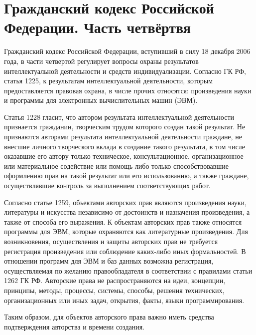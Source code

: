 \section{Гражданский кодекс Российской Федерации. Часть четвёртвя} \label{rights_gk}

Гражданский кодекс Российской Федерации, вступивший в силу 18 декабря 2006 года, в части четвертой регулирует вопросы охраны результатов интеллектуальной деятельности и  средств индивидуализации. Согласно ГК РФ, статья 1225, к результатам интеллектуальной деятельности, которым предоставляется правовая охрана, в числе прочих относятся: произведения науки и программы для электронных вычислительных машин (ЭВМ).

\vspace{\baselineskip}
Статья 1228 гласит, что автором результата интеллектуальной деятельности признается гражданин, творческим трудом которого создан такой результат. Не признаются авторами результата интеллектуальной деятельности граждане, не внесшие личного творческого вклада в создание такого результата, в том числе оказавшие его автору только техническое, консультационное, организационное или материальное содействие или помощь либо только способствовавшие оформлению прав на такой результат или его использованию, а также граждане, осуществлявшие контроль за выполнением соответствующих работ.

\vspace{\baselineskip}
Согласно статье 1259, объектами авторских прав являются произведения науки, литературы и искусства независимо от достоинств и назначения произведения, а также от способа его выражения. К объектам авторских прав также относятся программы для ЭВМ, которые охраняются как литературные произведения. Для возникновения, осуществления и защиты авторских прав не требуется регистрация произведения или соблюдение каких-либо иных формальностей. В отношении программ для ЭВМ и баз данных возможна регистрация, осуществляемая по желанию правообладателя в соответствии с правилами статьи 1262 ГК РФ. Авторские права не распространяются на идеи, концепции, принципы, методы, процессы, системы, способы, решения технических, организационных или иных задач, открытия, факты, языки программирования.

\vspace{\baselineskip}
Таким образом, для объектов авторского права важно иметь средства подтверждения авторства и времени создания.